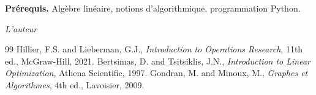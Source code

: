 \documentclass[12pt,a4paper,twoside]{book}
\theoremstyle{definition}
\theoremstyle{plain}
\theoremstyle{remark}
\begin{document}
\medskip

\noindent\textbf{Pr\'erequis.} Alg\`ebre lin\'eaire, notions d'algorithmique, programmation Python.

\vfill
\hfill\textit{L'auteur}


\mainmatter














\backmatter
\begin{thebibliography}{99}
 Hillier, F.S. and Lieberman, G.J., \emph{Introduction to Operations Research}, 11th ed., McGraw-Hill, 2021.
 Bertsimas, D. and Tsitsiklis, J.N., \emph{Introduction to Linear Optimization}, Athena Scientific, 1997.
 Gondran, M. and Minoux, M., \emph{Graphes et Algorithmes}, 4th ed., Lavoisier, 2009.
\end{thebibliography}
\printindex
\end{document}
